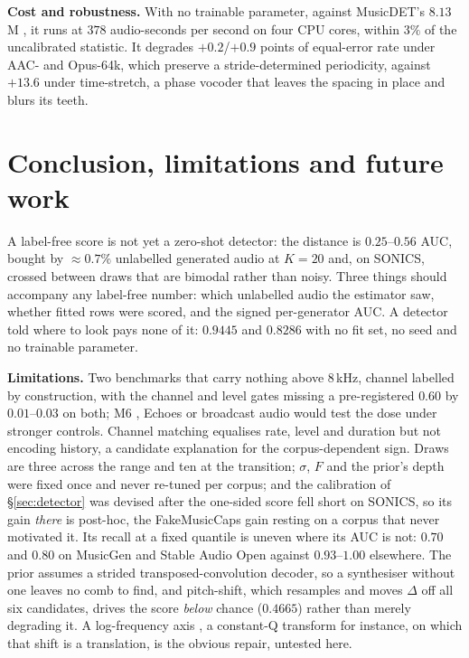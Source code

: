 \documentclass{article}
\begin{document}
\noindent\textbf{Cost and robustness.} With no trainable parameter, against
MusicDET's $8.13$\,M \cite{han2026musicdet}, it runs at $378$ audio-seconds per second
on four CPU cores, within $3\%$ of the uncalibrated statistic. It
degrades $+0.2$/$+0.9$ points of equal-error rate under AAC- and Opus-64k, which
preserve a stride-determined periodicity, against $+13.6$ under time-stretch, a
phase vocoder that leaves the spacing in place and blurs its teeth.

\section{Conclusion, limitations and future work}
\label{sec:conc}

A label-free score is not yet a zero-shot detector: the distance is $0.25$--$0.56$
AUC, bought by ${\approx}0.7\%$ unlabelled generated audio at $K{=}20$ and, on SONICS,
crossed between draws that are bimodal rather than noisy. Three things should
accompany any label-free number: which unlabelled audio the estimator saw, whether
fitted rows were scored, and the signed per-generator AUC. A detector told where to
look pays none of it: $0.9445$ and $0.8286$ with no fit set, no seed and no trainable
parameter.

\noindent\textbf{Limitations.} Two benchmarks that carry nothing above $8$\,kHz,
channel labelled by construction, with the channel and level gates missing a
pre-registered $0.60$ by $0.01$--$0.03$ on both; M6 \cite{li2026m6}, Echoes
\cite{pascu2026echoes} or broadcast audio \cite{lopezayala2026broadcast} would test
the dose under stronger controls. Channel
matching equalises rate, level and duration but not encoding history, a candidate
explanation for the corpus-dependent sign. Draws are three across the range and ten
at the transition; $\sigma$, $F$ and the prior's depth were fixed once and never
re-tuned per corpus; and the calibration of \S\ref{sec:detector} was devised after the
one-sided score fell short on SONICS, so its gain \emph{there} is post-hoc, the
FakeMusicCaps gain resting on a corpus that never motivated it. Its recall at a fixed quantile is
uneven where its AUC is not: $0.70$ and $0.80$ on MusicGen and Stable Audio Open
against $0.93$--$1.00$ elsewhere.
The prior assumes a strided transposed-convolution
decoder, so a synthesiser without one leaves no comb to find, and pitch-shift, which
resamples and moves $\Delta$ off all six candidates, drives the score \emph{below}
chance ($0.4665$) rather than merely degrading it. A log-frequency axis
\cite{dugelay2026improved}, a constant-Q transform for instance, on which that shift
is a translation, is the obvious repair, untested here.
\end{document}
